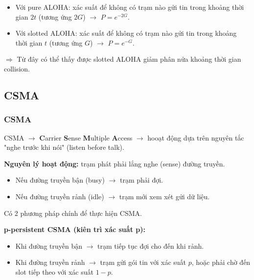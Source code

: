 \begin{itemize}
    \item[$\rightarrow$] Với pure ALOHA: xác suất để không có trạm nào gửi tin trong khoảng thời gian $2t$ (tương ứng $2G$) $\rightarrow$ $P = e^{-2G}$.
    \item[$\rightarrow$] Với slotted ALOHA: xác suất để không có trạm nào gửi tin trong khoảng thời gian $t$ (tương ứng $G$) $\rightarrow$ $P = e^{-G}$.
\end{itemize}
\medskip

\noindent
$\Rightarrow$ Từ đây có thể thấy được slotted ALOHA giảm phân nửa khoảng thời gian collision.
\medskip


\subsection{CSMA}

\subsubsection{CSMA}

\noindent
CSMA $\rightarrow$ \textbf{C}arrier \textbf{S}ense \textbf{M}ultiple \textbf{A}ccess $\rightarrow$ hooạt động dựa trên nguyên tắc "nghe trước khi nói" (listen before talk).
\medskip

\noindent
\textbf{Nguyên lý hoạt động:} trạm phát phải lắng nghe (sense) đường truyền.

\begin{itemize}
    \item Nếu đường truyền bận (busy) $\rightarrow$ trạm phải đợi.
    \item Nếu đường truyền rảnh (idle) $\rightarrow$ trạm mới xem xét gửi dữ liệu.
\end{itemize}
\medskip

\noindent
Có 2 phương pháp chính để thực hiện CSMA.
\medskip

\noindent
\textbf{p-persistent CSMA (kiên trì xác suất p):}

\begin{itemize}
    \item Khi đường truyền bận $\rightarrow$ trạm tiếp tục đợi cho đến khi rảnh.
    \item Khi đường truyền rảnh $\rightarrow$ trạm gửi gói tin với xác suất $p$, hoặc phải chờ đến slot tiếp theo với xác suất $1-p$.
\end{itemize}
\medskip

